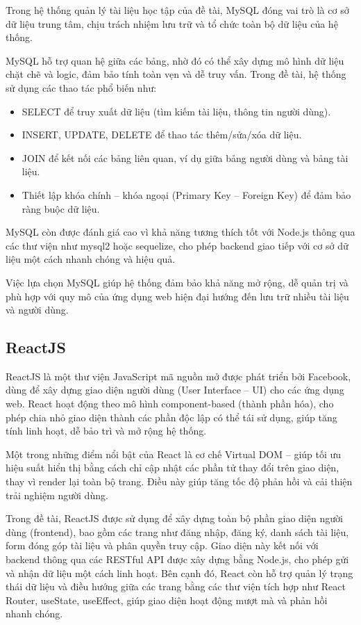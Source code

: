 \documentclass{article}
\begin{document}
	Trong hệ thống quản lý tài liệu học tập của đề tài, MySQL đóng vai trò là cơ sở dữ liệu trung tâm, chịu trách nhiệm lưu trữ và tổ chức toàn bộ dữ liệu của hệ thống.
	
	MySQL hỗ trợ quan hệ giữa các bảng, nhờ đó có thể xây dựng mô hình dữ liệu chặt chẽ và logic, đảm bảo tính toàn vẹn và dễ truy vấn. Trong đề tài, hệ thống sử dụng các thao tác phổ biến như:
	\begin{itemize}
		\item SELECT để truy xuất dữ liệu (tìm kiếm tài liệu, thông tin người dùng).
		\item INSERT, UPDATE, DELETE để thao tác thêm/sửa/xóa dữ liệu.
		\item JOIN để kết nối các bảng liên quan, ví dụ giữa bảng người dùng và bảng tài liệu.
		\item Thiết lập khóa chính – khóa ngoại (Primary Key – Foreign Key) để đảm bảo ràng buộc dữ liệu.
	\end{itemize}
	
	MySQL còn được đánh giá cao vì khả năng tương thích tốt với Node.js thông qua các thư viện như mysql2 hoặc sequelize, cho phép backend giao tiếp với cơ sở dữ liệu một cách nhanh chóng và hiệu quả.
	
	Việc lựa chọn MySQL giúp hệ thống đảm bảo khả năng mở rộng, dễ quản trị và phù hợp với quy mô của ứng dụng web hiện đại hướng đến lưu trữ nhiều tài liệu và người dùng.
	
	\subsection{ReactJS}
	
	ReactJS là một thư viện JavaScript mã nguồn mở được phát triển bởi Facebook, dùng để xây dựng giao diện người dùng (User Interface – UI) cho các ứng dụng web. React hoạt động theo mô hình component-based (thành phần hóa), cho phép chia nhỏ giao diện thành các phần độc lập có thể tái sử dụng, giúp tăng tính linh hoạt, dễ bảo trì và mở rộng hệ thống.
	
	Một trong những điểm nổi bật của React là cơ chế Virtual DOM – giúp tối ưu hiệu suất hiển thị bằng cách chỉ cập nhật các phần tử thay đổi trên giao diện, thay vì render lại toàn bộ trang. Điều này giúp tăng tốc độ phản hồi và cải thiện trải nghiệm người dùng.
	
	Trong đề tài, ReactJS được sử dụng để xây dựng toàn bộ phần giao diện người dùng (frontend), bao gồm các trang như đăng nhập, đăng ký, danh sách tài liệu, form đóng góp tài liệu và phân quyền truy cập. Giao diện này kết nối với backend thông qua các RESTful API được xây dựng bằng Node.js, cho phép gửi và nhận dữ liệu một cách linh hoạt. Bên cạnh đó, React còn hỗ trợ quản lý trạng thái dữ liệu và điều hướng giữa các trang bằng các thư viện tích hợp như React Router, useState, useEffect, giúp giao diện hoạt động mượt mà và phản hồi nhanh chóng.
	
\end{document}
